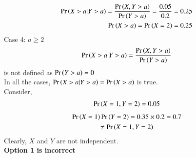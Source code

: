 \documentclass[journal,12pt,twocolumn]{IEEEtran}
\begin{document}
\begin{enumerate}
\begin{align}
        \Pr\left(X>a|Y>a\right)=\frac{\Pr\left(X,Y>a\right)}{\Pr\left(Y>a\right)}=\frac{0.05}{0.2}=0.25\\
        \Pr\left(X>a\right)=\Pr\left(X=2\right)=0.25
    \end{align}
    Case 4: $a\geq 2$
    \begin{align}
        \Pr\left(X>a|Y>a\right)=\frac{\Pr\left(X,Y>a\right)}{\Pr\left(Y>a\right)}
    \end{align}
    is not defined as $\Pr\left(Y>a\right)=0$\\
    In all the cases, $\Pr\left(X>a|Y>a\right)=\Pr\left(X>a\right)$ is true.\\
    Consider,
    \begin{align}
        \Pr\left(X=1,Y=2\right)=0.05
    \end{align}
    \begin{multline}
        \Pr\left(X=1\right)\Pr\left(Y=2\right)=0.35\times0.2=0.7\\\neq\Pr\left(X=1,Y=2\right)
    \end{multline} 
    Clearly, $X$ and $Y$ are not independent. \\
    \textbf{Option 1 is incorrect}
    

\end{enumerate}
\end{document}
